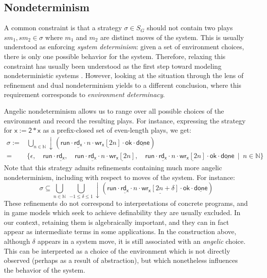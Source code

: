 \documentclass[draft,11pt]{report}
\theoremstyle{definition}
\newcommand{\kw}[1]{\ensuremath{ \mathsf{#1} }}
\begin{document}

\subsection{Nondeterminism} \label{sec:bg:gsnondet} %

A common constraint is that a strategy $\sigma \in S_G$
should not contain two plays $s m_1, s m_2 \in \sigma$
where $m_1$ and $m_2$ are distinct moves of the system.
This is usually understood as
enforcing \emph{system determinism}:
given a set of environment choices,
there is only one possible behavior for the system.
Therefore,
relaxing this constraint has usually been understood
as the first step toward modeling nondeterministic systems
\citep{gsfnd}.
However,
looking at the situation through the lens of
refinement and dual nondeterminism
yields to a different conclusion,
where this requirement corresponds to
\emph{environment determinacy}.


Angelic nondeterminism
allows us to range over all possible choices of the environment
and record the resulting plays.
For instance,
expressing the strategy for $\kw{x := 2 * x}$
as a prefix-closed set of even-length plays,
we get:
\begin{align*}
  \sigma := {} &
    \bigcup_{n \in \mathbb{N}} {\downarrow}(
      \kw{run} \cdot
      \underline{\kw{rd}_\kw{x}} \cdot n \cdot
      \underline{\kw{wr}_\kw{x}[2n]} \cdot \kw{ok} \cdot
      \underline{\kw{done}}) \\
        = {} & \{ \epsilon, \quad
        \kw{run} \cdot
        \underline{\kw{rd}_\kw{x}} , \quad
        \kw{run} \cdot
        \underline{\kw{rd}_\kw{x}} \cdot n \cdot
        \underline{\kw{wr}_\kw{x}[2n]} , \quad
        \kw{run} \cdot
        \underline{\kw{rd}_\kw{x}} \cdot n \cdot
        \underline{\kw{wr}_\kw{x}[2n]} \cdot \kw{ok} \cdot
        \underline{\kw{done}}
        \: \mid \: n \in \mathbb{N} \}
\end{align*}
Note that this strategy admits refinements
containing much more angelic nondeterminism,
including with respect to moves of the system.
For instance:
\[
  \sigma \subseteq
    \bigcup_{n \in \mathbb{N}} \:
    \bigcup_{-1 \le \delta \le 1}
    {\downarrow}(
      \kw{run} \cdot
      \underline{\kw{rd}_\kw{x}} \cdot n \cdot
      \underline{\kw{wr}_\kw{x}[2n + \delta]} \cdot \kw{ok} \cdot
      \underline{\kw{done}})
\]
These refinements do not correspond to interpretations
of concrete programs,
and in game models which seek to achieve definability
they are usually excluded.
In our context, retaining them is algebraically important,
and they can in fact appear as intermediate terms
in some applications.
In the construction above,
although $\delta$ appears in a system move,
it is still associated with an \emph{angelic} choice.
This can be interpreted as a choice of the environment
which is not directly observed
(perhaps as a result of abstraction),
but which nonetheless influences the behavior of the system.
\end{document}
